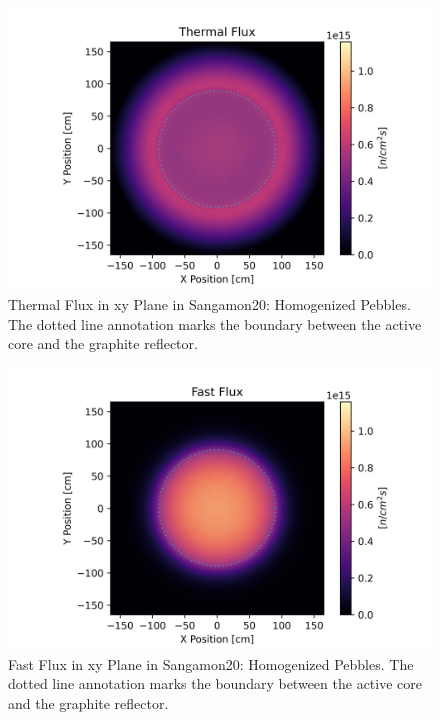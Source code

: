 \begin{figure}[H]
\centering

  \includegraphics[width=0.87\linewidth]{figures/therm_xy_plane_homog_er.png}
  \caption{Thermal Flux in xy Plane in Sangamon20: Homogenized Pebbles.  The dotted line annotation marks the boundary between the active core and the graphite reflector.}
  \label{fig:hom-plane-therm}

\end{figure}


\begin{figure}[H]
\centering

 \includegraphics[width=0.87\linewidth]{figures/fast_xy_plane_homog_er.png}
 \caption{Fast Flux in xy Plane in Sangamon20: Homogenized Pebbles.  The dotted line annotation marks the boundary between the active core and the graphite reflector.}
 \label{fig:hom-plane-fast}

\end{figure}